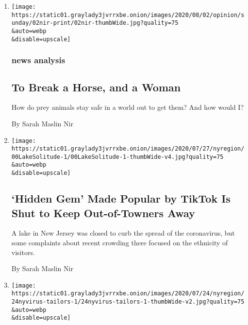 \begin{enumerate}
\def\labelenumi{\arabic{enumi}.}
\item
  \href{/2020/08/02/sunday-review/horse-crazy-nir-language.html}{}

  \texttt{[image: https://static01.graylady3jvrrxbe.onion/images/2020/08/02/opinion/sunday/02nir-print/02nir-thumbWide.jpg?quality=75\\\&auto=webp\\\&disable=upscale]}

  \hypertarget{news-analysis}{%
  \subsubsection{news analysis}\label{news-analysis}}

  \hypertarget{to-break-a-horse-and-a-woman}{%
  \subsection{To Break a Horse, and a
  Woman}\label{to-break-a-horse-and-a-woman}}

  How do prey animals stay safe in a world out to get them? And how
  would I?

  By Sarah Maslin Nir
\item
  \href{/2020/07/29/nyregion/lake-solitude-closed-racism.html}{}

  \texttt{[image: https://static01.graylady3jvrrxbe.onion/images/2020/07/27/nyregion/00LakeSolitude-1/00LakeSolitude-1-thumbWide-v4.jpg?quality=75\\\&auto=webp\\\&disable=upscale]}

  \hypertarget{hidden-gem-made-popular-by-tiktok-is-shut-to-keep-out-of-towners-away}{%
  \subsection{`Hidden Gem' Made Popular by TikTok Is Shut to Keep
  Out-of-Towners
  Away}\label{hidden-gem-made-popular-by-tiktok-is-shut-to-keep-out-of-towners-away}}

  A lake in New Jersey was closed to curb the spread of the coronavirus,
  but some complaints about recent crowding there focused on the
  ethnicity of visitors.

  By Sarah Maslin Nir
\item
  \href{/2020/07/25/nyregion/coronavirus-tailors-cleaners-weight-gain.html}{}

  \texttt{[image: https://static01.graylady3jvrrxbe.onion/images/2020/07/24/nyregion/24nyvirus-tailors-1/24nyvirus-tailors-1-thumbWide-v2.jpg?quality=75\\\&auto=webp\\\&disable=upscale]}


\end{enumerate}
